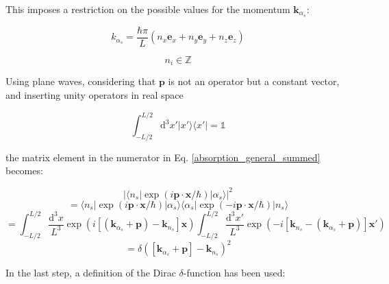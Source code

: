 \documentclass{article}
\begin{document}
This imposes a restriction on the possible values for the momentum $\mathbf{k}_{\alpha_s}$:

\begin{equation}
	\label{k_quantization}
	k_{\alpha_s} = \frac{\hbar \pi}{L} \left( n_x \mathbf{e}_x + n_y \mathbf{e}_y + n_z \mathbf{e}_z \right)
\end{equation}

\begin{equation*}
	n_i \in \mathbb{Z}
\end{equation*}

Using plane waves, considering that $\mathbf{p}$ is not an operator but a constant vector, and inserting unity operators in real space

\begin{equation}
	\int_{-L/2}^{L/2} \mathrm{d}^3 x' \left| x' \rangle \langle x' \right| = \mathbb{1}
\end{equation}

the matrix element in the numerator in Eq. \ref{absorption_general_summed} becomes:

\begin{equation}
	\label{plane_wave_delta}
	\left| \langle n_s | \exp{\left( i \mathbf{p} \cdot \mathbf{x} / \hbar \right)} | \alpha_s \rangle \right|^2 
\end{equation}
\begin{equation*}
	= \langle n_s | \exp{\left( i \mathbf{p} \cdot \mathbf{x} / \hbar \right)} | \alpha_s \rangle \langle \alpha_s | \exp{\left( -i \mathbf{p} \cdot \mathbf{x} / \hbar \right)} | n_s \rangle
\end{equation*}
\begin{equation*}
	= \int_{-L/2}^{L/2} \frac{\mathrm{d}^3 x}{L^3} \exp{ \left( i \left[ \left( \mathbf{k}_{\alpha_s} + \mathbf{p} \right) - \mathbf{k}_{n_s} \right] \mathbf{x} \right) } \int_{-L/2}^{L/2}\frac{\mathrm{d}^3 x'}{L^3} \exp{ \left( - i \left[ \mathbf{k}_{n_s} - \left( \mathbf{k}_{\alpha_s} + \mathbf{p} \right) \right] \mathbf{x}' \right) }
\end{equation*}
\begin{equation*}
	= \delta \left( \left[ \mathbf{k}_{\alpha_s} + \mathbf{p} \right] - \mathbf{k}_{n_s} \right)^2
\end{equation*}

In the last step, a definition of the Dirac $\delta$-function has been used:
\end{document}
